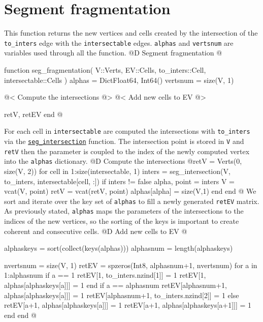\documentclass[10pt,oneside]{article}
\begin{document}
\section{Segment fragmentation}
This function returns the new vertices and cells created by the intersection of 
the \texttt{to\_inters} edge with the \texttt{intersectable} edges.
\texttt{alphas} and \texttt{vertsnum} are variables used through all the function.
@D Segment fragmentation
@{function seg_fragmentation(
    V::Verts, EV::Cells, 
    to_inters::Cell, intersectable::Cells
)
    alphas = Dict{Float64, Int64}()
    vertsnum = size(V, 1)

    @< Compute the intersections @>
    @< Add new cells to EV @>
    
    retV, retEV
end
@}
For each cell in \texttt{intersectable} are computed the intersections with \texttt{to\_inters} via 
the \hyperref[seg_intersection]{\texttt{seg\_intersection}} function. The intersection point is
stored in \texttt{V} and \texttt{retV} then the parameter is coupled to the index of the newly 
computed vertex into the \texttt{alphas} dictionary.
@D Compute the intersections
@{retV = Verts(0, size(V, 2))
for cell in 1:size(intersectable, 1)
    inters = seg_intersection(V, to_inters, intersectable[cell, :])
    if inters != false
        alpha, point = inters
        V = vcat(V, point)
        retV = vcat(retV, point)
        alphas[alpha] = size(V,1)
    end
end
@}
We sort and iterate over the key set of \texttt{alphas}
to fill a newly generated \texttt{retEV} matrix. As previously stated, \texttt{alphas} maps 
the parameters of the intersections to the indices of the new vertices, so the sorting of the keys 
is important to create coherent and consecutive cells.
@D Add new cells to EV
@{alphaskeys = sort(collect(keys(alphas)))
alphasnum = length(alphaskeys)

nvertsnum = size(V, 1)
retEV = spzeros(Int8, alphasnum+1, nvertsnum)
for a in 1:alphasnum
    if a == 1
        retEV[1, to_inters.nzind[1]] = 1
        retEV[1, alphas[alphaskeys[a]]] = 1
    end
    if a == alphasnum
        retEV[alphasnum+1, alphas[alphaskeys[a]]] = 1
        retEV[alphasnum+1, to_inters.nzind[2]] = 1
    else
        retEV[a+1, alphas[alphaskeys[a]]] = 1
        retEV[a+1, alphas[alphaskeys[a+1]]] = 1
    end
end
@}

\end{document}
